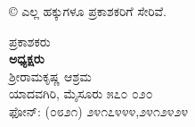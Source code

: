 \thispagestyle{empty}

\begin{center}
© ಎಲ್ಲ ಹಕ್ಕುಗಳೂ ಪ್ರಕಾಶಕರಿಗೆ ಸೇರಿವೆ.
\end{center}

\begin{center}
ಪ್ರಕಾಶಕರು\\\textbf{ಅಧ್ಯಕ್ಷರು}\\ಶ್ರೀರಾಮಕೃಷ್ಣ ಆಶ್ರಮ\\ಯಾದವಗಿರಿ, ಮೈಸೂರು ೫೭೦ ೦೨೦\\ಫೋನ್​: (೦೮೨೧) ೨೪೧೭೪೪೪,೨೪೧೨೪೨೪
\end{center}

